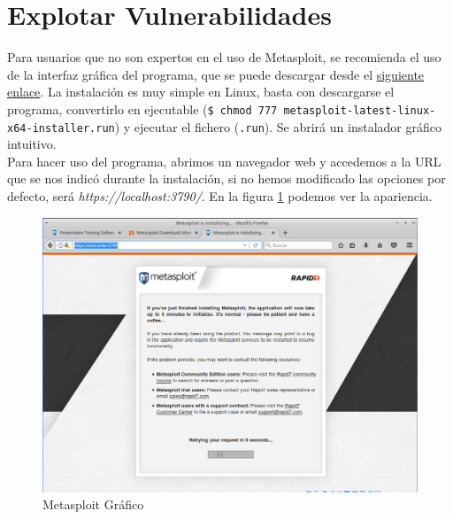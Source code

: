 \documentclass[a4,12pt,onecolum]{article}
\begin{document}

\clearpage
\section{Explotar Vulnerabilidades}

Para usuarios que no son expertos en el uso de Metasploit, se recomienda el uso de la interfaz gráfica del programa, que se puede descargar desde el \href{https://www.rapid7.com/products/metasploit/download/}{siguiente enlace}. La instalación es muy simple en Linux, basta con descargarse el programa, convertirlo en ejecutable (\texttt{\$ chmod 777 metasploit-latest-linux-x64-installer.run}) y ejecutar el fichero (\texttt{.run}). Se abrirá un instalador gráfico intuitivo. \\

Para hacer uso del programa, abrimos un navegador web y accedemos a la URL que se nos indicó durante la instalación, si no hemos modificado las opciones por defecto, será \emph{https://localhost:3790/}. En la figura \ref{fig:meta3} podemos ver la apariencia.

\begin{figure}[htbp]
\centering
\includegraphics[width=1.0\textwidth]{./images/Atacante_metasploit_grafico.png}
\caption{Metasploit Gráfico}
\label{fig:meta3}
\end{figure}
\end{document}
